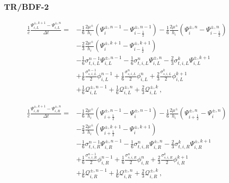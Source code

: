 \documentclass[preprint,12pt]{elsarticle}
\newcommand{\fn}[1]{\left( #1 \right)}
\newcommand{\pec}{\, ,}
\newcommand{\lequ}[1]{\label{eq:#1}}
\newcommand{\lsec}[1]{\label{sec:#1}}
\newcommand{\half}{\frac{1}{2}}
\newcommand{\sixth}{\frac{1}{6}}
\newcommand{\Q}{\mathcal{Q}}
\newcommand{\dt}{\Delta t}
\newcommand{\iL}{_{i,L}}
\newcommand{\iR}{_{i,R}}
\begin{document}
\subsubsection{TR/BDF-2}\lsec{S2fullTRBDF2}
\begin{equation}\lequ{S2BDF2fullL}\begin{split}
  \frac{1}{c}\frac{\Psi\iL^{\pm,k+1}-\Psi\iL^{\pm,n}}{\dt} = &
   -\sixth     \frac{2\mu^\pm}{h_i}\fn{\Psi^{\pm,n-1}_i - \Psi^{\pm,n-1}_{i-\half}}
   -\sixth     \frac{2\mu^\pm}{h_i}\fn{\Psi^{\pm,n}_i   - \Psi^{\pm,n}_{i-\half}}\\
  &-\frac{2}{3}\frac{2\mu^\pm}{h_i}\fn{\Psi^{\pm,k+1}_i - \Psi^{\pm,k+1}_{i-\half}}\\
  &-\sixth\sigma_{t,i,L}^{n-1}\Psi\iL^{\pm,n-1}
   -\sixth\sigma_{t,i,L}^{n}  \Psi\iL^{\pm,n}
   -\frac{2}{3}\sigma_{t,i,L}^k\Psi\iL^{\pm,k+1}\\
  &+\sixth\frac{\sigma_{s,i,L}^{n-1}}{2}\phi\iL^{n-1}
   +\sixth\frac{\sigma_{s,i,L}^{n}}{2}  \phi\iL^{n}
   +\frac{2}{3}\frac{\sigma_{s,i,L}^k}{2}\phi\iL^{k+1}\\
  &+\sixth\Q_{i,L}^{\pm,n-1}
   +\sixth\Q_{i,L}^{\pm,n}
   +\frac{2}{3}\Q_{i,L}^{\pm,k} \pec
\end{split}\end{equation}

\begin{equation}\lequ{S2BDF2fullR}\begin{split}
  \frac{1}{c}\frac{\Psi\iR^{\pm,k+1}-\Psi\iR^{\pm,n}}{\dt} = &
   -\sixth     \frac{2\mu^\pm}{h_i}\fn{\Psi^{\pm,n-1}_{i+\half} - \Psi^{\pm,n-1}_i}
   -\sixth     \frac{2\mu^\pm}{h_i}\fn{\Psi^{\pm,n}_{i+\half}   - \Psi^{\pm,n}_i}\\
  &-\frac{2}{3}\frac{2\mu^\pm}{h_i}\fn{\Psi^{\pm,k+1}_{i+\half} - \Psi^{\pm,k+1}_i}\\
  &-\sixth\sigma_{t,i,R}^{n-1}\Psi\iR^{\pm,n-1}
   -\sixth\sigma_{t,i,R}^{n}  \Psi\iR^{\pm,n}
   -\frac{2}{3}\sigma_{t,i,R}^k\Psi\iR^{\pm,k+1}\\
  &+\sixth\frac{\sigma_{s,i,R}^{n-1}}{2}\phi\iR^{n-1}
   +\sixth\frac{\sigma_{s,i,R}^{n}}{2}  \phi\iR^{n}
   +\frac{2}{3}\frac{\sigma_{s,i,R}^k}{2}\phi\iR^{k+1}\\
  &+\sixth\Q_{i,R}^{\pm,n-1}
   +\sixth\Q_{i,R}^{\pm,n}
   +\frac{2}{3}\Q_{i,R}^{\pm,k} \pec
\end{split}\end{equation}


\end{document}
